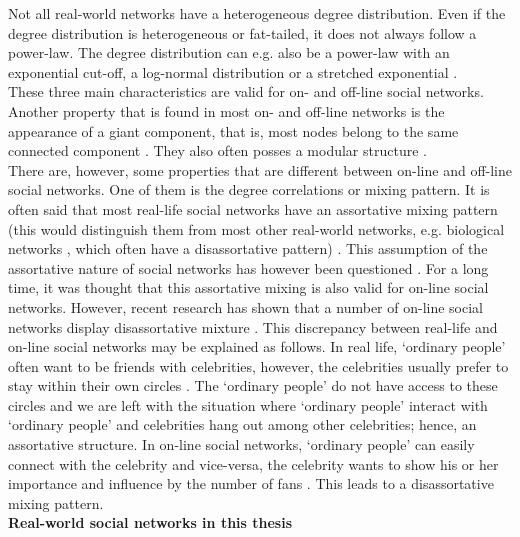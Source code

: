 \documentclass[11 pt , letterpaper , twoside , openright]{book}
\begin{document}
\newline
Not all real-world networks have a heterogeneous degree distribution. Even if the degree distribution is heterogeneous or fat-tailed, it does not always follow a power-law. The degree distribution can e.g. also be a power-law with an exponential cut-off, a log-normal distribution or a stretched exponential \cite{Newman2005}.\\
\newline
These three main characteristics are valid for on- and off-line social networks. Another property that is found in most on- and off-line networks is the appearance of a giant component, that is, most nodes belong to the same connected component \cite{Latapy}. They also often posses a modular structure \cite{Ferrara2012}\cite{McGlohon2011}. \\
\newline
There are, however, some properties that are different between on-line and off-line social networks. One of them is the degree correlations or mixing pattern. It is often said that most real-life social networks have an assortative mixing pattern (this would distinguish them from most other real-world networks, e.g. biological networks \cite{F.Costa2007}, which often have a disassortative pattern) \cite{Fisher2017}\cite{Hu2009}\cite{Zhang2014}. This assumption of the assortative nature of social networks has however been questioned \cite{Fisher2017}\cite{Whitney2010}. For a long time, it was thought that this assortative mixing is also valid for on-line social networks. However, recent research has shown that a number of on-line social networks display disassortative mixture \cite{Holme2004}\cite{Hu2009}\cite{Zhang2014}. This discrepancy between real-life and on-line social networks may be explained as follows. In real life, `ordinary people' often want to be friends with celebrities, however, the celebrities usually prefer to stay within their own circles \cite{Hu2009}\cite{Zhang2014}. The `ordinary people' do not have access to these circles and we are left with the situation where `ordinary people' interact with `ordinary people' and celebrities hang out among other celebrities; hence, an assortative structure. In on-line social networks, `ordinary people' can easily connect with the celebrity and vice-versa, the celebrity wants to show his or her importance and influence by the number of fans \cite{Hu2009}\cite{Zhang2014}. This leads to a disassortative mixing pattern.\\
\newline
\textbf{Real-world social networks in this thesis}\\
\end{document}
